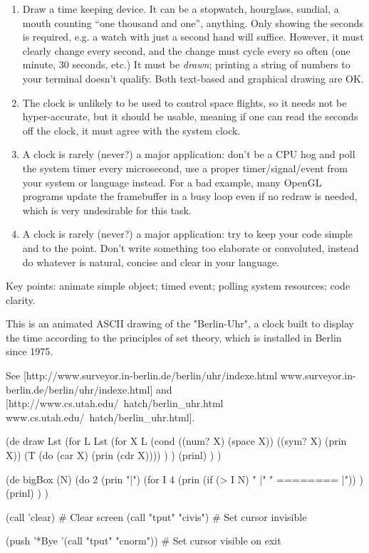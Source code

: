 \begin{enumerate}
\item
  Draw a time keeping device. It can be a stopwatch, hourglass, sundial,
  a mouth counting ``one thousand and one'', anything. Only showing the
  seconds is required, e.g. a watch with just a second hand will
  suffice. However, it must clearly change every second, and the change
  must cycle every so often (one minute, 30 seconds, etc.) It must be
  \emph{drawn}; printing a string of numbers to your terminal doesn't
  qualify. Both text-based and graphical drawing are OK.
\item
  The clock is unlikely to be used to control space flights, so it needs
  not be hyper-accurate, but it should be usable, meaning if one can
  read the seconds off the clock, it must agree with the system clock.
\item
  A clock is rarely (never?) a major application: don't be a CPU hog and
  poll the system timer every microsecond, use a proper
  timer/signal/event from your system or language instead. For a bad
  example, many OpenGL programs update the framebuffer in a busy loop
  even if no redraw is needed, which is very undesirable for this task.
\item
  A clock is rarely (never?) a major application: try to keep your code
  simple and to the point. Don't write something too elaborate or
  convoluted, instead do whatever is natural, concise and clear in your
  language.
\end{enumerate}

Key points: animate simple object; timed event; polling system
resources; code clarity.


\begin{wideverbatim}

This is an animated ASCII drawing of the "Berlin-Uhr", a clock built to display
the time according to the principles of set theory, which is installed in Berlin
since 1975.

See [http://www.surveyor.in-berlin.de/berlin/uhr/indexe.html
www.surveyor.in-berlin.de/berlin/uhr/indexe.html] and
[http://www.cs.utah.edu/~hatch/berlin_uhr.html
www.cs.utah.edu/~hatch/berlin_uhr.html].

(de draw Lst
   (for L Lst
      (for X L
         (cond
            ((num? X) (space X))
            ((sym? X) (prin X))
            (T (do (car X) (prin (cdr X)))) ) )
      (prinl) ) )

(de bigBox (N)
   (do 2
      (prin "|")
      (for I 4
         (prin (if (> I N) "          |" " ======== |")) )
      (prinl) ) )

(call 'clear)          # Clear screen
(call "tput" "civis")  # Set cursor invisible

(push '*Bye '(call "tput" "cnorm"))  # Set cursor visible on exit

\end{wideverbatim}

